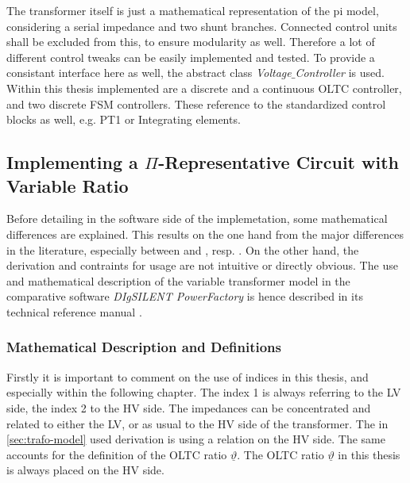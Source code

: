 The transformer itself is just a mathematical representation of the pi model, considering a serial impedance and two shunt branches.
Connected control units shall be excluded from this, to ensure modularity as well. 
Therefore a lot of different control tweaks can be easily implemented and tested.
To provide a consistant interface here as well, the abstract class \textit{Voltage$\_$Controller} is used.
Within this thesis implemented are a discrete and a continuous \acs{OLTC} controller, and two discrete \acs{FSM} controllers.
These reference to the standardized control blocks as well, e.g. PT1 or Integrating elements.

\subsection{Implementing a \texorpdfstring{$\Pi{}$}{}-Representative Circuit with Variable Ratio}

Before detailing in the software side of the implemetation, some mathematical differences are explained.
This results on the one hand from the major differences in the literature, especially between \textcite{machowski_2020} and \textcite{kundur_2022}, resp. \textcite{milano_2010}.
On the other hand, the derivation and contraints for usage are not intuitive or directly obvious.
The use and mathematical description of the variable transformer model in the comparative software \textit{DIgSILENT PowerFactory} is hence described in its technical reference manual \quelle. 

\subsubsection{Mathematical Description and Definitions}

Firstly it is important to comment on the use of indices in this thesis, and especially within the following chapter.
The index 1 is always referring to the \acs{LV} side, the index 2 to the \acs{HV} side. 
The impedances can be concentrated and related to either the \acs{LV}, or as usual to the \acs{HV} side of the transformer. 
The in \autoref{sec:trafo-model} used derivation is using a relation on the \acs{HV} side.
The same accounts for the definition of the \acs{OLTC} ratio $\underline{\vartheta}$.     
The \acs{OLTC} ratio $\underline{\vartheta}$ in this thesis is always placed on the \acs{HV} side.

